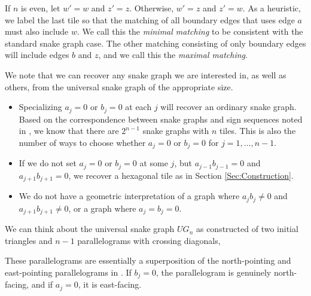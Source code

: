 If $n$ is even, let $w' = w$ and $z' = z$. Otherwise, $w' = z$ and $z' = w$. As a heuristic, we label the last tile so that the matching of all boundary edges that uses edge $a$ must also include $w$. We call this the \emph{minimal matching} to be consistent with the standard snake graph case. The other matching consisting of only boundary edges will include edges $b$ and $z$, and we call this the \emph{maximal matching}.


We note that we can recover any snake graph we are interested in, as well as others, from the universal snake graph of the appropriate size.
\begin{itemize}\itemsep=0pt
\item Specializing $a_j = 0$ or $b_j = 0$ at each $j$ will recover an ordinary snake graph. Based on the correspondence between snake graphs and sign sequences noted in \cite{Canakci-Schiffler}, we know that there are $2^{n-1}$ snake graphs with $n$ tiles. This is also the number of ways to choose whether $a_j = 0$ or $b_j = 0$ for $j = 1, \ldots, n-1$.
\item If we do not set $a_j = 0$ or $b_j = 0$ at some $j$, but $a_{j-1}b_{j-1} = 0$ and $a_{j+1}b_{j+1} = 0$, we recover a hexagonal tile as in Section \ref{Sec:Construction}.
\item We do not have a geometric interpretation of a graph where $a_jb_j \neq 0$ and $a_{j+1}b_{j+1} \neq 0$, or a graph where $a_j = b_j = 0$.
\end{itemize}

\begin{Remark}
We can think about the universal snake graph $UG_n$ as constructed of two initial triangles and $n-1$ parallelograms with crossing diagonals,
\begin{center}
\end{center}

These parallelograms are essentially a superposition of the north-pointing and east-pointing parallelograms in \cite{MW}. If $b_j = 0$, the parallelogram is genuinely north-facing, and if $a_j = 0$, it is east-facing.
\end{Remark}

